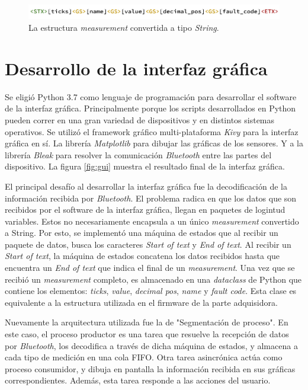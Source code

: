 \begin{figure}[htpb]
\centering
\includegraphics[width=.9\textwidth]{./Figures/measurement-string.png}
\caption{La estructura \textit{measurement} convertida a tipo \textit{String}.}
\label{fig:measurement-string}
\end{figure}


\section{Desarrollo de la interfaz gráfica}

Se eligió Python 3.7 como lenguaje de programación para desarrollar el software de la interfaz gráfica. Principalmente porque los scripts desarrollados en Python pueden correr en una gran variedad de dispositivos y en distintos sistemas operativos. Se utilizó el framework gráfico multi-plataforma \textit{Kivy} para la interfaz gráfica en sí. La librería \textit{Matplotlib} para dibujar las gráficas de los sensores. Y a la librería \textit{Bleak} para resolver la comunicación \textit{Bluetooth} entre las partes del dispositivo. La figura \ref{fig:gui} muestra el resultado final de la interfaz gráfica.

El principal desafío al desarrollar la interfaz gráfica fue la decodificación de la información recibida por \textit{Bluetooth}. 
El problema radica en que los datos que son recibidos por el software de la interfaz gráfica, llegan en paquetes de logintud variables. Estos no necesariamente encapsula a un único \textit{measurement} convertido a String. Por esto, se implementó una máquina de estados que al recibir un paquete de datos, busca los caracteres \textit{Start of text} y \textit{End of text}. Al recibir un \textit{Start of text}, la máquina de estados concatena los datos recibidos hasta que encuentra un \textit{End of text} que indica el final de un \textit{measurement}. Una vez que se recibió un \textit{measurement} completo, es almacenado en una \textit{dataclass} de Python que contiene los elementos: \textit{ticks}, \textit{value}, \textit{decimal pos}, \textit{name} y \textit{fault code}. Esta clase es equivalente a la estructura utilizada en el firmware de la parte adquisidora.

Nuevamente la arquitectura utilizada fue la de "Segmentación de proceso". En este caso, el proceso productor es una tarea que resuelve la recepción de datos por \textit{Bluetooth}, los decodifica a través de dicha máquina de estados, y almacena a cada tipo de medición en una cola FIFO. Otra tarea asincrónica actúa como proceso consumidor, y dibuja en pantalla la información recibida en sus gráficas correspondientes. Además, esta tarea responde a las acciones del usuario.

